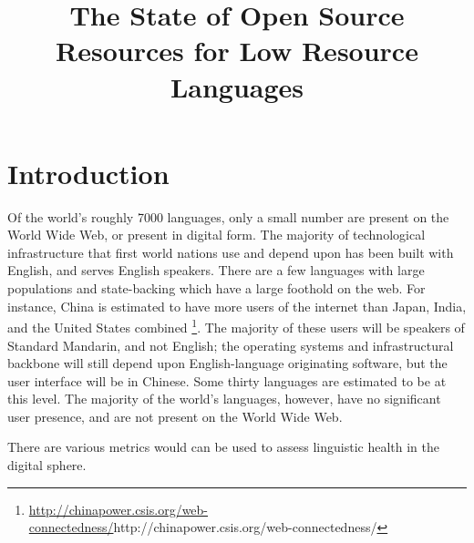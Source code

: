 \documentclass[10pt, a4paper]{article}
\title{The State of Open Source Resources for Low Resource Languages}
\begin{document}
\maketitleabstract

\section{Introduction}

Of the world's roughly 7000 languages, only a small number are present on the World Wide Web, or present in digital form. The majority of technological infrastructure that first world nations use and depend upon has been built with English, and serves English speakers. There are a few languages with large populations and state-backing which have a large foothold on the web. For instance, China is estimated to have more users of the internet than Japan, India, and the United States combined \footnote{\url{http://chinapower.csis.org/web-connectedness/}{http://chinapower.csis.org/web-connectedness/}}. The majority of these users will be speakers of Standard Mandarin, and not English; the operating systems and infrastructural backbone will still depend upon English-language originating software, but the user interface will be in Chinese. Some thirty languages \cite{Crubadan} are estimated to be at this level. The majority of the world's languages, however, have no significant user presence, and are not present on the World Wide Web.

There are various metrics would can be used to assess linguistic health in the digital sphere.
\end{document}
